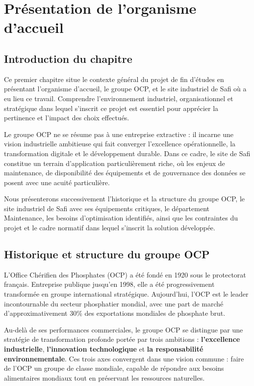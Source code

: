 \documentclass[a4paper,12pt]{report}
\begin{document}

\chapter{Présentation de l'organisme d'accueil}

\section*{Introduction du chapitre}

Ce premier chapitre situe le contexte général du projet de fin d'études en présentant l'organisme d'accueil, le groupe OCP, et le site industriel de Safi où a eu lieu ce travail. Comprendre l'environnement industriel, organisationnel et stratégique dans lequel s'inscrit ce projet est essentiel pour apprécier la pertinence et l'impact des choix effectués.

Le groupe OCP ne se résume pas à une entreprise extractive : il incarne une vision industrielle ambitieuse qui fait converger l'excellence opérationnelle, la transformation digitale et le développement durable. Dans ce cadre, le site de Safi constitue un terrain d'application particulièrement riche, où les enjeux de maintenance, de disponibilité des équipements et de gouvernance des données se posent avec une acuité particulière.

Nous présenterons successivement l'historique et la structure du groupe OCP, le site industriel de Safi avec ses équipements critiques, le département Maintenance, les besoins d'optimisation identifiés, ainsi que les contraintes du projet et le cadre normatif dans lequel s'inscrit la solution développée.

\section{Historique et structure du groupe OCP}

L'Office Chérifien des Phosphates (OCP) a été fondé en 1920 sous le protectorat français. Entreprise publique jusqu'en 1998, elle a été progressivement transformée en groupe international stratégique. Aujourd'hui, l'OCP est le leader incontournable du secteur phosphatier mondial, avec une part de marché d'approximativement 30\% des exportations mondiales de phosphate brut.

Au-delà de ses performances commerciales, le groupe OCP se distingue par une stratégie de transformation profonde portée par trois ambitions : \textbf{l'excellence industrielle}, \textbf{l'innovation technologique} et \textbf{la responsabilité environnementale}. Ces trois axes convergent dans une vision commune : faire de l'OCP un groupe de classe mondiale, capable de répondre aux besoins alimentaires mondiaux tout en préservant les ressources naturelles.
\end{document}
